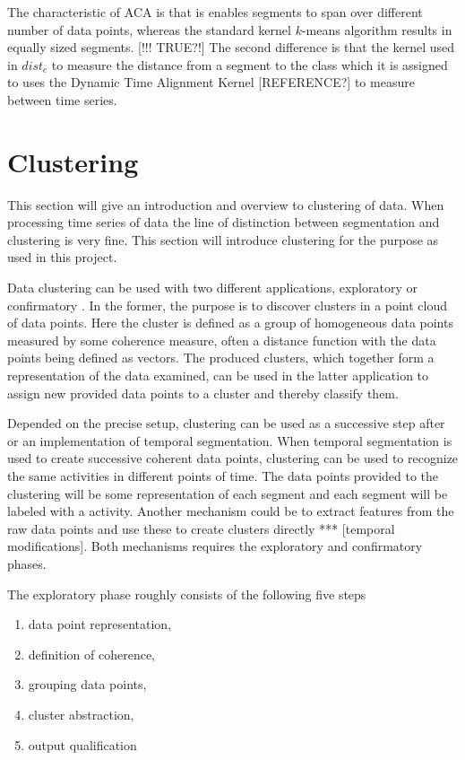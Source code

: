 The characteristic of ACA is that is enables segments to span over different 
number of data points, whereas the standard kernel $k$-means algorithm results 
in equally sized segments. [!!! TRUE?!] The second difference is that the 
kernel used in $\mathit{dist}_c$ to measure the distance from a segment to the 
class which it is assigned to uses the Dynamic Time Alignment Kernel 
[REFERENCE?] to measure between time series.


\section{Clustering}

This section will give an introduction and overview to clustering of data. 
When processing time series of data the line of distinction between 
segmentation and clustering is very fine. This section will introduce 
clustering for the purpose as used in this project.

Data clustering can be used with two different applications, exploratory or 
confirmatory \cite{jain1999data}. In the former, the purpose is to discover 
clusters in a point cloud of data points. Here the cluster is defined as a 
group of homogeneous data points measured by some coherence measure, often a 
distance function with the data points being defined as vectors. The produced 
clusters, which together form a representation of the data examined, can be 
used in the 
latter application to assign new provided data points to a cluster and thereby 
classify them.

Depended on the precise setup, clustering can be used as a successive step 
after or an implementation of temporal segmentation. When temporal 
segmentation is used to create successive coherent data points, clustering can 
be used to recognize the same activities in different points of time. The data 
points provided to the clustering will be some representation of each segment 
and each segment will be labeled with a activity. Another mechanism could be 
to extract features from the raw data points and use these to create clusters 
directly *** [temporal modifications]. Both mechanisms requires the 
exploratory and confirmatory phases.

The exploratory phase roughly consists of the following five steps 
\cite{jain1999data}
\begin{enumerate}
	\item data point representation,
	\item definition of coherence,
	\item grouping data points,
	\item cluster abstraction,
	\item output qualification
\end{enumerate}

